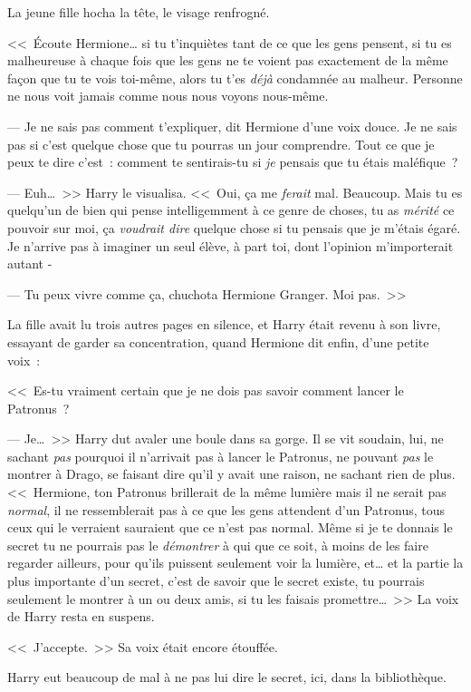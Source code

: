 La jeune fille hocha la tête, le visage renfrogné.

<<~Écoute Hermione… si tu t'inquiètes tant de ce que les gens pensent, si tu es malheureuse à chaque fois que les gens ne te voient pas exactement de la même façon que tu te vois toi-même, alors tu t'es \emph{déjà} condamnée au malheur. Personne ne nous voit jamais comme nous nous voyons nous-même.

--- Je ne sais pas comment t'expliquer, dit Hermione d'une voix douce. Je ne sais pas si c'est quelque chose que tu pourras un jour comprendre. Tout ce que je peux te dire c'est~: comment te sentirais-tu si \emph{je} pensais que tu étais maléfique~?

--- Euh…~>> Harry le visualisa. <<~Oui, ça me \emph{ferait} mal. Beaucoup. Mais tu es quelqu'un de bien qui pense intelligemment à ce genre de choses, tu as \emph{mérité} ce pouvoir sur moi, ça \emph{voudrait dire} quelque chose si tu pensais que je m'étais égaré. Je n'arrive pas à imaginer un seul élève, à part toi, dont l'opinion m'importerait autant -

--- Tu peux vivre comme ça, chuchota Hermione Granger. Moi pas.~>>

La fille avait lu trois autres pages en silence, et Harry était revenu à son livre, essayant de garder sa concentration, quand Hermione dit enfin, d'une petite voix~:

<<~Es-tu vraiment certain que je ne dois pas savoir comment lancer le Patronus~?

--- Je…~>> Harry dut avaler une boule dans sa gorge. Il se vit soudain, lui, ne sachant \emph{pas} pourquoi il n'arrivait pas à lancer le Patronus, ne pouvant \emph{pas} le montrer à Drago, se faisant dire qu'il y avait une raison, ne sachant rien de plus. <<~Hermione, ton Patronus brillerait de la même lumière mais il ne serait pas \emph{normal}, il ne ressemblerait pas à ce que les gens attendent d'un Patronus, tous ceux qui le verraient sauraient que ce n'est pas normal. Même si je te donnais le secret tu ne pourrais pas le \emph{démontrer} à qui que ce soit, à moins de les faire regarder ailleurs, pour qu'ils puissent seulement voir la lumière, et… et la partie la plus importante d'un secret, c'est de savoir que le secret existe, tu pourrais seulement le montrer à un ou deux amis, si tu les faisais promettre…~>> La voix de Harry resta en suspens.

<<~J'accepte.~>> Sa voix était encore étouffée.

Harry eut beaucoup de mal à ne pas lui dire le secret, ici, dans la bibliothèque.

